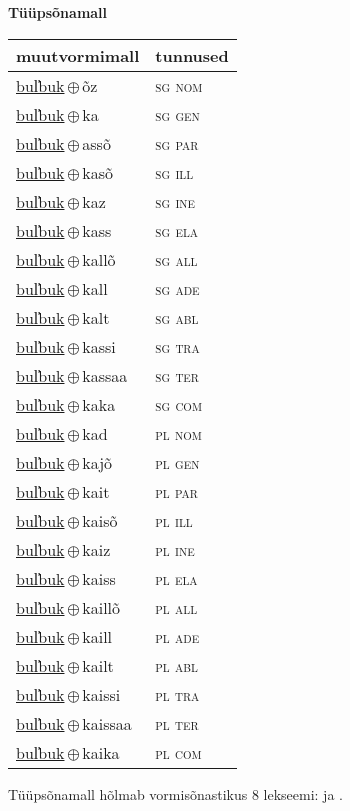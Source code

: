 

\vspace{3.5em}
\noindent \begin{minipage}{\textwidth}
\noindent \textbf{Tüüpsõnamall \,}\\

\begin{sideways}
\begin{tabular}{l l}
muutvormimall & tunnused \\
\hline
\underline{bul̕buk}\,$\oplus$\,õz & \textsc{ sg nom } \\
\underline{bul̕buk}\,$\oplus$\,ka & \textsc{ sg gen } \\
\underline{bul̕buk}\,$\oplus$\,assõ & \textsc{ sg par } \\
\underline{bul̕buk}\,$\oplus$\,kasõ & \textsc{ sg ill } \\
\underline{bul̕buk}\,$\oplus$\,kaz & \textsc{ sg ine } \\
\underline{bul̕buk}\,$\oplus$\,kass & \textsc{ sg ela } \\
\underline{bul̕buk}\,$\oplus$\,kallõ & \textsc{ sg all } \\
\underline{bul̕buk}\,$\oplus$\,kall & \textsc{ sg ade } \\
\underline{bul̕buk}\,$\oplus$\,kalt & \textsc{ sg abl } \\
\underline{bul̕buk}\,$\oplus$\,kassi & \textsc{ sg tra } \\
\underline{bul̕buk}\,$\oplus$\,kassaa & \textsc{ sg ter } \\
\underline{bul̕buk}\,$\oplus$\,kaka & \textsc{ sg com } \\
\underline{bul̕buk}\,$\oplus$\,kad & \textsc{ pl nom } \\
\underline{bul̕buk}\,$\oplus$\,kajõ & \textsc{ pl gen } \\
\underline{bul̕buk}\,$\oplus$\,kait & \textsc{ pl par } \\
\underline{bul̕buk}\,$\oplus$\,kaisõ & \textsc{ pl ill } \\
\underline{bul̕buk}\,$\oplus$\,kaiz & \textsc{ pl ine } \\
\underline{bul̕buk}\,$\oplus$\,kaiss & \textsc{ pl ela } \\
\underline{bul̕buk}\,$\oplus$\,kaillõ & \textsc{ pl all } \\
\underline{bul̕buk}\,$\oplus$\,kaill & \textsc{ pl ade } \\
\underline{bul̕buk}\,$\oplus$\,kailt & \textsc{ pl abl } \\
\underline{bul̕buk}\,$\oplus$\,kaissi & \textsc{ pl tra } \\
\underline{bul̕buk}\,$\oplus$\,kaissaa & \textsc{ pl ter } \\
\underline{bul̕buk}\,$\oplus$\,kaika & \textsc{ pl com } \\
\end{tabular}
\end{sideways}
\label{tab:tüüpsõnamall-bul̕bukõz}

\end{minipage}

 
\vspace{1em}
\noindent Tüüpsõnamall  hõlmab vormisõnastikus 8 lekseemi:  ja .
